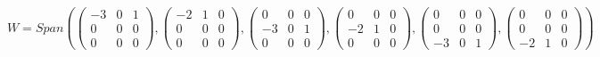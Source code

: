 \documentclass[12pt]{article}
\begin{document}
\begin{enumerate}
    \[
      W = 
        Span \left(
          \left(\begin{array}{ccc}
          -3 & 0 & 1 \\
          0 & 0 & 0 \\
          0 & 0 & 0
        \end{array}\right) , \left(\begin{array}{ccc}
          -2 & 1 & 0 \\
          0 & 0 & 0 \\
          0 & 0 & 0
        \end{array}\right) , \left(\begin{array}{ccc}
          0 & 0 & 0 \\
          -3 & 0 & 1 \\
          0 & 0 & 0
        \end{array}\right) , \left(\begin{array}{ccc}
          0 & 0 & 0 \\
          -2& 1& 0 \\
          0 & 0 & 0
        \end{array}\right) , \left(\begin{array}{ccc}
          0 & 0 & 0 \\
          0 & 0 & 0 \\
          -3 & 0 &  1
        \end{array}\right) , \left(\begin{array}{ccc}
          0 & 0 & 0 \\
          0 & 0 & 0 \\
          -2 & 1 & 0 
        \end{array}\right)
        \right)
    \]
    

\end{enumerate}
\end{document}
